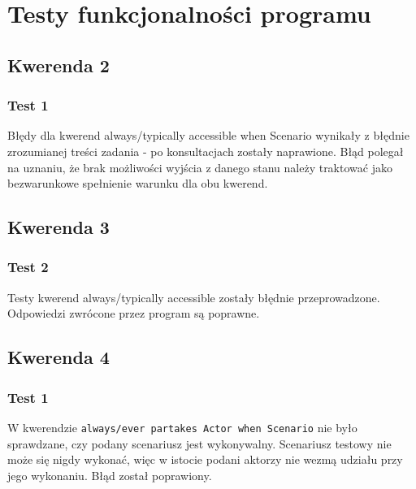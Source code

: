 \documentclass{article}
\begin{document}
\section{Testy funkcjonalności programu}
\subsection{Kwerenda 2}
\subsubsection{Test 1}
Błędy dla kwerend always/typically accessible when Scenario wynikały z błędnie zrozumianej treści zadania - po konsultacjach zostały naprawione. Błąd polegał na uznaniu, że brak możliwości wyjścia z danego stanu należy traktować jako bezwarunkowe spełnienie warunku dla obu kwerend.

\subsection{Kwerenda 3}
\subsubsection{Test 2}

Testy kwerend always/typically accessible zostały błędnie przeprowadzone. Odpowiedzi zwrócone przez program są poprawne.

\subsection{Kwerenda 4}
\subsubsection{Test 1}

W kwerendzie \texttt{always/ever partakes Actor when Scenario} nie było sprawdzane, czy podany scenariusz jest wykonywalny. Scenariusz testowy nie może się nigdy wykonać, więc w istocie podani aktorzy nie wezmą udziału przy jego wykonaniu. Błąd został poprawiony.
\end{document}

